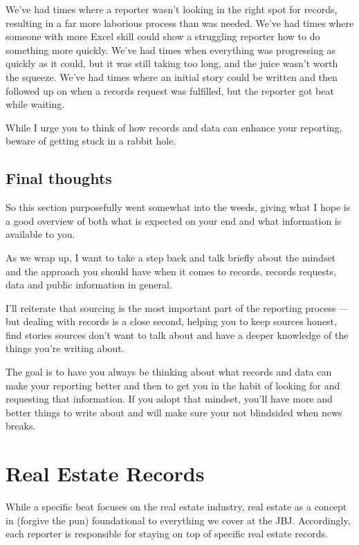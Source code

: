 \documentclass[
  11pt,
  american,
  letterpaperpaper,
  extrafontsizes,onecolumn,openright
  ]{memoir}
\begin{document}
We've had times where a reporter wasn't looking in the right spot for records, resulting in a far more laborious process than was needed. We've had times where someone with more Excel skill could show a struggling reporter how to do something more quickly. We've had times when everything was progressing as quickly as it could, but it was still taking too long, and the juice wasn't worth the squeeze. We've had times where an initial story could be written and then followed up on when a records request was fulfilled, but the reporter got beat while waiting.

While I urge you to think of how records and data can enhance your reporting, beware of getting stuck in a rabbit hole.

\hypertarget{final-thoughts-1}{%
\section*{Final thoughts}\label{final-thoughts-1}}

So this section purposefully went somewhat into the weeds, giving what I hope is a good overview of both what is expected on your end and what information is available to you.

As we wrap up, I want to take a step back and talk briefly about the mindset and the approach you should have when it comes to records, records requests, data and public information in general.

I'll reiterate that sourcing is the most important part of the reporting process --- but dealing with records is a close second, helping you to keep sources honest, find stories sources don't want to talk about and have a deeper knowledge of the things you're writing about.

The goal is to have you always be thinking about what records and data can make your reporting better and then to get you in the habit of looking for and requesting that information. If you adopt that mindset, you'll have more and better things to write about and will make sure your not blindsided when news breaks.

\hypertarget{real-estate-records}{%
\chapter{Real Estate Records}\label{real-estate-records}}

While a specific beat focuses on the real estate industry, real estate as a concept in (forgive the pun) foundational to everything we cover at the JBJ. Accordingly, each reporter is responsible for staying on top of specific real estate records.
\end{document}
